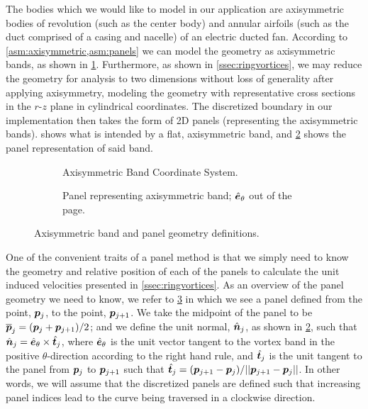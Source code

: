 The bodies which we would like to model in our application are axisymmetric bodies of revolution (such as the center body) and annular airfoils (such as the duct comprised of a casing and nacelle) of an electric ducted fan.
%
According to \cref{asm:axisymmetric,asm:panels} we can model the geometry as axisymmetric bands, as shown in \cref{fig:flatbandgeometry}.
%
Furthermore, as shown in \cref{ssec:ringvortices}, we may reduce the geometry for analysis to two dimensions without loss of generality after applying axisymmetry, modeling the geometry with representative cross sections in the \(r\)-\(z\) plane in cylindrical coordinates.%
%
The discretized boundary in our implementation then takes the form of 2D panels (representing the axisymmetric bands).
%
 shows what is intended by a flat, axisymmetric band, and \cref{fig:flatpanelgeometry} shows the panel representation of said band.

\begin{figure}[h!]
     \centering
     \begin{subfigure}[t]{0.45\textwidth}
         \centering
        
        \caption{Axisymmetric Band Coordinate System.}
        \label{fig:flatbandgeometry}
     \end{subfigure}
     \hfill
     \begin{subfigure}[t]{0.45\textwidth}
         \centering
         \raisebox{2em}{}
        \caption{Panel representing axisymmetric band; \(\hat{\bm{e}}_\theta\) out of the page.}
        \label{fig:flatpanelgeometry}
     \end{subfigure}
    \caption{Axisymmetric band and panel geometry definitions.}
    \label{fig:axisymmetricbandpanelgeometry}
\end{figure}

One of the convenient traits of a panel method is that we simply need to know the geometry and relative position of each of the panels to calculate the unit induced velocities presented in \cref{ssec:ringvortices}.
%
As an overview of the panel geometry we need to know, we refer to \cref{fig:axisymmetricbandpanelgeometry} in which we see a panel defined from the point, {\(\bm{p}_j\)}, to the point, {\(\bm{p}_{j+1}\)}.
%
We take the midpoint of the panel to be \({\overline{\bm{p}}_j}={(\bm{p}_{j}+\bm{p}_{j+1})}/2\); and we define the unit normal, {\(\hat{\bm{n}}_j\)}, as shown in \cref{fig:flatpanelgeometry},
such that \(\hat{\bm{n}}_j=\hat{\bm{e}}_\theta\times\hat{\bm{t}}_j\),
where \(\hat{\bm{e}}_\theta\) is the unit vector tangent to the vortex band in the positive \(\theta\)-direction according to the right hand rule,
and {\(\hat{\bm{t}}_j\)} is the unit tangent to the panel from {\(\bm{p}_j\)} to {\(\bm{p}_{j+1}\)}
such that \(\hat{\bm{t}}_j = (\bm{p}_{j+1}-\bm{p}_j)/||\bm{p}_{j+1}-\bm{p}_j||\).
%
In other words, we will assume that the discretized panels are defined such that increasing panel indices lead to the curve being traversed in a clockwise direction.

